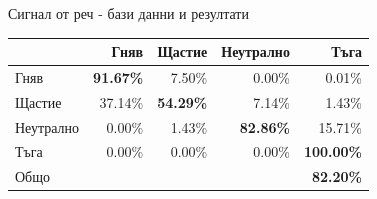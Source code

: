 \documentclass[9pt]{beamer}
\begin{document}
\begin{frame}[t]{Сигнал от реч - бази данни и резултати}
\begin{center}
{\begin{tabular}{|l|r r r r|}
                \hline
                & Гняв & Щастие & Неутрално & Тъга \\ 
                \hline
                Гняв &  \textbf{91.67\%} & 7.50\% & 0.00\% & 0.01\% \\ 
                Щастие & 37.14\% & \textbf{54.29\%} & 7.14\% & 1.43\% \\ 
                Неутрално & 0.00\% & 1.43\% & \textbf{82.86\%} & 15.71\% \\ 
                Тъга & 0.00\% & 0.00\% & 0.00\% & \textbf{100.00\%}\\ 
                \hline
                \hline
                Общо & & & & \textbf{82.20\%}\\
                \hline
            \end{tabular}}
        \end{center}
    \end{frame}
\end{document}

